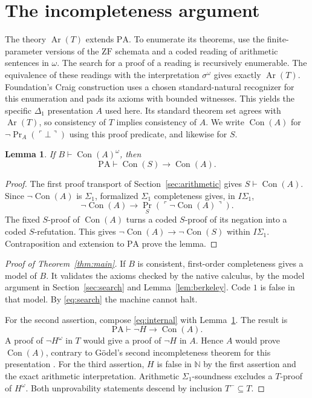\documentclass[11pt,letterpaper]{article}
\newtheorem{lemma}[theorem]{Lemma}
\theoremstyle{definition}
\newcommand{\ZF}{\mathrm{ZF}}
\newcommand{\PA}{\mathrm{PA}}
\newcommand{\Con}{\operatorname{Con}}
\newcommand{\Prv}{\operatorname{Pr}}
\newcommand{\N}{\mathbb{N}}
\newcommand{\setread}[1]{#1^{\omega}}
\begin{document}
\section{The incompleteness argument}\label{sec:incompleteness}

The theory $\operatorname{Ar}(T)$ extends $\PA$. To enumerate its
theorems, use the finite-parameter versions of the $\ZF$ schemata
and a coded reading of arithmetic sentences in $\omega$.
The search for a proof of a reading is recursively enumerable.
The equivalence of these readings with the interpretation
$\setread{\sigma}$ gives exactly $\operatorname{Ar}(T)$.
Foundation's Craig construction uses a chosen standard-natural
recognizer for this enumeration and pads its axioms with
bounded witnesses. This yields the specific $\Delta_1$
presentation $A$ used here. Its standard theorem set agrees with
$\operatorname{Ar}(T)$, so consistency of $T$ implies consistency
of $A$. We write $\Con(A)$ for $\neg\Prv_A(\ulcorner\bot\urcorner)$
using this proof predicate, and likewise for $S$.

\begin{lemma}\label{lem:transfer}
If $B\vdash\setread{\Con(A)}$, then
\[
        \PA\vdash \Con(S)\longrightarrow\Con(A).
\]
\end{lemma}

\begin{proof}
The first proof transport of Section~\ref{sec:arithmetic} gives
$S\vdash\Con(A)$. Since $\neg\Con(A)$ is $\Sigma_1$,
formalized $\Sigma_1$ completeness gives, in $I\Sigma_1$,
\[
  \neg\Con(A)\longrightarrow\Prv_S(\ulcorner\neg\Con(A)\urcorner).
\]
The fixed $S$-proof of $\Con(A)$ turns a coded $S$-proof of
its negation into a coded $S$-refutation. This gives
$\neg\Con(A)\to\neg\Con(S)$ within $I\Sigma_1$. Contraposition
and extension to $\PA$ prove the lemma.
\end{proof}

\begin{proof}[Proof of Theorem~\ref{thm:main}]
If $B$ is consistent, first-order completeness gives a model
of $B$. It validates the axioms checked by the native calculus,
by the model argument in Section~\ref{sec:search} and
Lemma~\ref{lem:berkeley}. Code $1$ is false in that model.
By \eqref{eq:search} the machine cannot halt.

For the second assertion, compose \eqref{eq:internal} with
Lemma~\ref{lem:transfer}. The result is
\[
         \PA\vdash \neg H\longrightarrow\Con(A).
\]
A proof of $\neg\setread H$ in $T$ would give a proof of
$\neg H$ in $A$. Hence $A$ would prove $\Con(A)$, contrary to
G\"odel's second incompleteness theorem for this presentation
\cite{goedel}. For the third assertion, $H$ is false in $\N$ by the
first assertion and the exact arithmetic interpretation. Arithmetic
$\Sigma_1$-soundness excludes a $T$-proof of $\setread H$.
Both unprovability statements descend by inclusion $T^-\subseteq T$.
\end{proof}
\end{document}
